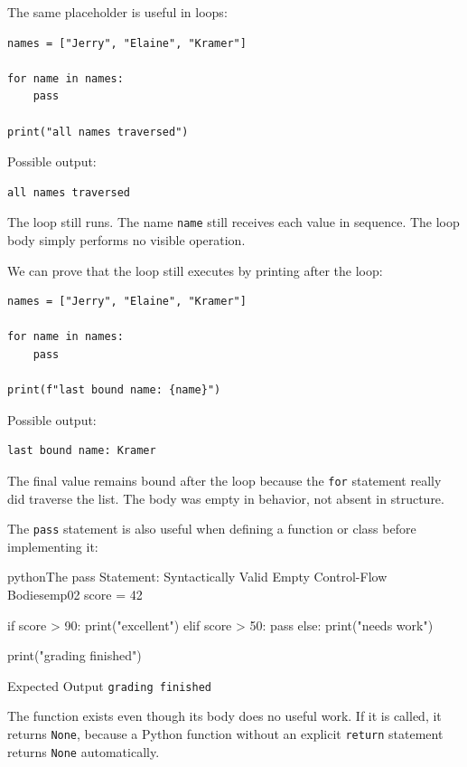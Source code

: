 \documentclass[a4paper,twoside]{report}
\begin{document}
The same placeholder is useful in loops:

\begin{verbatim}
names = ["Jerry", "Elaine", "Kramer"]

for name in names:
    pass

print("all names traversed")
\end{verbatim}

Possible output:

\begin{verbatim}
all names traversed
\end{verbatim}

The loop still runs. The name \texttt{name} still receives each value in sequence. The loop body simply performs no visible operation.

We can prove that the loop still executes by printing after the loop:

\begin{verbatim}
names = ["Jerry", "Elaine", "Kramer"]

for name in names:
    pass

print(f"last bound name: {name}")
\end{verbatim}

Possible output:

\begin{verbatim}
last bound name: Kramer
\end{verbatim}

The final value remains bound after the loop because the \texttt{for} statement really did traverse the list. The body was empty in behavior, not absent in structure.

The \texttt{pass} statement is also useful when defining a function or class before implementing it:

\begin{codebox}[]{python}{The pass Statement: Syntactically Valid Empty Control-Flow Bodies}{emp02}
score = 42

if score > 90:
    print("excellent")
elif score > 50:
    pass
else:
    print("needs work")

print("grading finished")
\end{codebox}


\begin{iobox}{Expected Output}
\texttt{grading finished} \\
\end{iobox}




The function exists even though its body does no useful work. If it is called, it returns \texttt{None}, because a Python function without an explicit \texttt{return} statement returns \texttt{None} automatically.
\end{document}
